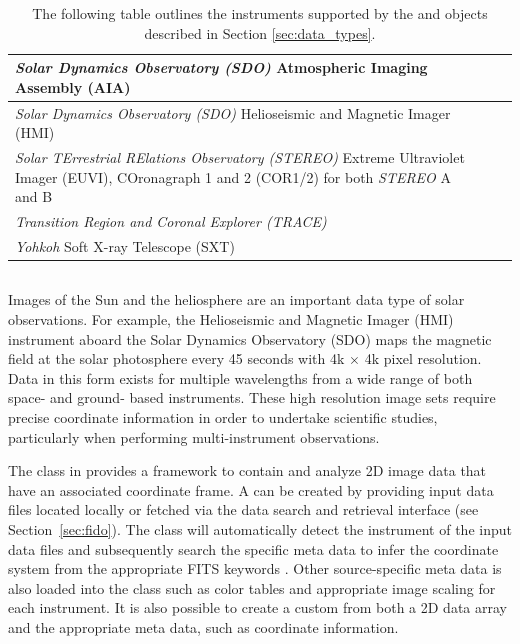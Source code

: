 \begin{table}
\begin{center}
\begin{tabular}{|p{12cm}|c|c|}
\hline
\textit{Solar Dynamics Observatory (SDO)} Atmospheric Imaging Assembly (AIA) & \citep{lemen2012} \\
\hline
\textit{Solar Dynamics Observatory (SDO)} Helioseismic and Magnetic Imager (HMI) & \citep{schou12}  \\
\hline
\textit{Solar TErrestrial RElations Observatory (STEREO)} Extreme Ultraviolet Imager (EUVI), COronagraph 1 and 2 (COR1/2) for both \textit{STEREO} A and B & \citep{howard2008sun} \\
\hline
\textit{Transition Region and Coronal Explorer (TRACE)}  & \citep{handy99}  \\
\hline
\textit{Yohkoh} Soft X-ray Telescope (SXT) & \citep{tsuneta1991soft}  \\
\hline
\end{tabular}
\end{center}
\caption{The following table outlines the instruments supported by the \Timeseries and \Map objects described in Section \ref{sec:data_types}.}
\label{tab:instruments}
\end{table}

\subsection{\Map}
\label{sec:map}
Images of the Sun and the heliosphere are an important data type of solar observations. 
For example, the Helioseismic and Magnetic Imager (HMI) instrument aboard the Solar Dynamics Observatory (SDO) maps the magnetic field at the solar photosphere every 45 seconds with 4k $\times$ 4k pixel resolution.
Data in this form exists for multiple wavelengths from a wide range of both space- and ground- based instruments.
These high resolution image sets require precise coordinate information in order to undertake scientific studies, particularly when performing multi-instrument observations. 

The \Map class in \sunpypkg provides a framework to contain and analyze 2D image data that have an associated coordinate frame. 
A \Map can be created by providing input data files located locally or fetched via the \sunpypkg data search and retrieval interface \Fido (see Section~\ref{sec:fido}).
The \Map class will automatically detect the instrument of the input data files and subsequently search the specific meta data to infer the coordinate system from the appropriate FITS keywords \citep{refId0, 2006A&A...449..791T}.
Other source-specific meta data is also loaded into the \Map class such as color tables and appropriate image scaling for each instrument.
It is also possible to create a custom \Map from both a 2D data array and the appropriate meta data, such as coordinate information.

